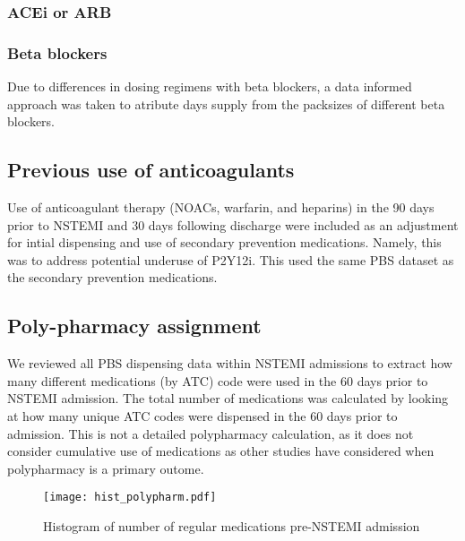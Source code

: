 \documentclass[11pt]{article}
\begin{document}
\subsubsection{ACEi or ARB}
\color{violet}
\begin{stlog}\end{stlog}
\color{black}
\pagebreak
\subsubsection{Beta blockers}
Due to differences in dosing regimens with beta blockers, a data informed approach was taken to atribute days supply from the packsizes of different beta blockers. \cite{pbsmellish}
\color{violet}
\begin{stlog}\end{stlog}
\color{black}
\pagebreak
\subsection{Previous use of anticoagulants}
Use of anticoagulant therapy (NOACs, warfarin, and heparins) in the 90 days prior to NSTEMI and 30 days following discharge were included as an adjustment for intial dispensing and use of secondary prevention medications. Namely, this was to address potential underuse of P2Y12i. This used the same PBS dataset as the secondary prevention medications.
\color{violet}
\begin{stlog}\end{stlog}
\color{black}
\pagebreak
\subsection{Poly-pharmacy assignment}
We reviewed all PBS dispensing data within NSTEMI admissions to extract how many different medications (by ATC) code were used in the 60 days prior to NSTEMI admission. The total number of medications was calculated by looking at how many unique ATC codes were dispensed in the 60 days prior to admission. This is not a detailed polypharmacy calculation, as it does not consider cumulative use of medications as other studies have considered when polypharmacy is a primary outome. \cite{polypharmacy2017} 
\color{violet}
\begin{stlog}\end{stlog}
\color{black}
\begin{figure} [h]
	\centering
	\texttt{[image: hist\_polypharm.pdf]}
	\caption{Histogram of number of regular medications pre-NSTEMI admission}
	\label{hist_polypharm}
\end{figure}
\end{document}
